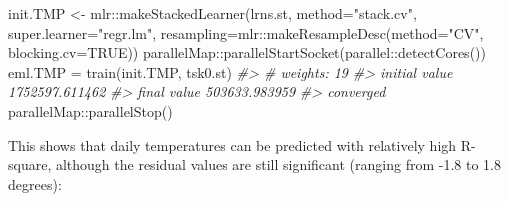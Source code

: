 \documentclass[
  graybox,natbib,nospthms]{svmono}
\newenvironment{Shaded}{\begin{snugshade}}{\end{snugshade}}
\newcommand{\AttributeTok}[1]{\textcolor[rgb]{0.61,0.61,0.61}{#1}}
\newcommand{\CommentTok}[1]{\textcolor[rgb]{0.37,0.37,0.37}{\textit{#1}}}
\newcommand{\ConstantTok}[1]{\textcolor[rgb]{0,0,0}{#1}}
\newcommand{\FunctionTok}[1]{\textcolor[rgb]{0,0,0}{#1}}
\newcommand{\NormalTok}[1]{#1}
\newcommand{\OtherTok}[1]{\textcolor[rgb]{0.37,0.37,0.37}{#1}}
\newcommand{\SpecialCharTok}[1]{\textcolor[rgb]{0,0,0}{#1}}
\newcommand{\StringTok}[1]{\textcolor[rgb]{0.5,0.5,0.5}{#1}}
\begin{document}
\begin{Shaded}
\begin{Highlighting}[]
\NormalTok{init.TMP }\OtherTok{\textless{}{-}}\NormalTok{ mlr}\SpecialCharTok{::}\FunctionTok{makeStackedLearner}\NormalTok{(lrns.st, }\AttributeTok{method=}\StringTok{"stack.cv"}\NormalTok{, }\AttributeTok{super.learner=}\StringTok{"regr.lm"}\NormalTok{, }
                                    \AttributeTok{resampling=}\NormalTok{mlr}\SpecialCharTok{::}\FunctionTok{makeResampleDesc}\NormalTok{(}\AttributeTok{method=}\StringTok{"CV"}\NormalTok{, }\AttributeTok{blocking.cv=}\ConstantTok{TRUE}\NormalTok{))}
\NormalTok{parallelMap}\SpecialCharTok{::}\FunctionTok{parallelStartSocket}\NormalTok{(parallel}\SpecialCharTok{::}\FunctionTok{detectCores}\NormalTok{())}
\NormalTok{eml.TMP }\OtherTok{=} \FunctionTok{train}\NormalTok{(init.TMP, tsk0.st)}
\CommentTok{\#\textgreater{} \# weights:  19}
\CommentTok{\#\textgreater{} initial  value 1752597.611462 }
\CommentTok{\#\textgreater{} final  value 503633.983959 }
\CommentTok{\#\textgreater{} converged}
\NormalTok{parallelMap}\SpecialCharTok{::}\FunctionTok{parallelStop}\NormalTok{()}
\end{Highlighting}
\end{Shaded}

This shows that daily temperatures can be predicted with relatively high R-square,
although the residual values are still significant (ranging from -1.8 to 1.8 degrees):
\end{document}
